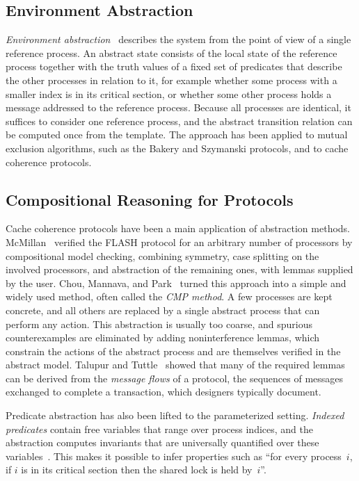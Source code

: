 \subsection{Environment Abstraction}

\emph{Environment abstraction}~\cite{CTV06,CTV08} describes the system from
the point of view of a single reference process. An abstract state consists of
the local state of the reference process together with the truth values of a
fixed set of predicates that describe the other processes in relation to it,
for example whether some process with a smaller index is in its critical
section, or whether some other process holds a message addressed to the
reference process. Because all processes are identical, it suffices to
consider one reference process, and the abstract transition relation can be
computed once from the template. The
approach has been applied to mutual exclusion algorithms, such as the Bakery
and Szymanski protocols, and to cache coherence protocols.

\subsection{Compositional Reasoning for Protocols}

Cache coherence protocols have been a main application of abstraction
methods. McMillan~\cite{McM01} verified the FLASH protocol for an arbitrary
number of processors by compositional model checking, combining symmetry,
case splitting on the involved processors, and abstraction of the remaining
ones, with lemmas supplied by the user. Chou, Mannava, and Park~\cite{CMP04}
turned this approach into a simple and widely used method, often called the
\emph{CMP method}. A few processes are kept concrete, and all others are
replaced by a single abstract process that can perform any action. This
abstraction is usually too coarse, and spurious counterexamples are
eliminated by adding noninterference lemmas, which constrain the actions of
the abstract process and are themselves verified in the abstract model.
Talupur and Tuttle~\cite{TT08} showed that many of the required lemmas can be
derived from the \emph{message flows} of a protocol, the sequences of messages
exchanged to complete a transaction, which designers typically document.

Predicate abstraction has also been lifted to the parameterized setting.
\emph{Indexed predicates} contain free variables that range over process
indices, and the abstraction computes invariants that are universally
quantified over these variables~\cite{LB07}. This makes it possible to infer
properties such as ``for every process~$i$, if $i$ is in its critical section
then the shared lock is held by~$i$''.

